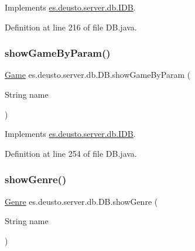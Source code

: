 Implements \hyperlink{interfacees_1_1deusto_1_1server_1_1db_1_1_i_d_b_a572028cc62d36bebee977200b55eba8b}{es.\+deusto.\+server.\+db.\+I\+DB}.



Definition at line 216 of file D\+B.\+java.

\mbox{\label{classes_1_1deusto_1_1server_1_1db_1_1_d_b_a4fc9590d7e5643184ef89c3f03468e7e}} 
\subsubsection{\texorpdfstring{show\+Game\+By\+Param()}{showGameByParam()}}
{\footnotesize\ttfamily \hyperlink{classes_1_1deusto_1_1server_1_1db_1_1data_1_1_game}{Game} es.\+deusto.\+server.\+db.\+D\+B.\+show\+Game\+By\+Param (\begin{DoxyParamCaption}\item[{String}]{name }\end{DoxyParamCaption})}



Implements \hyperlink{interfacees_1_1deusto_1_1server_1_1db_1_1_i_d_b_a0364013a2f73f89fd5f8c635d5c9405a}{es.\+deusto.\+server.\+db.\+I\+DB}.



Definition at line 254 of file D\+B.\+java.

\mbox{\label{classes_1_1deusto_1_1server_1_1db_1_1_d_b_a207ddeb183db925dc20f095033aa4d94}} 
\subsubsection{\texorpdfstring{show\+Genre()}{showGenre()}}
{\footnotesize\ttfamily \hyperlink{classes_1_1deusto_1_1server_1_1db_1_1data_1_1_genre}{Genre} es.\+deusto.\+server.\+db.\+D\+B.\+show\+Genre (\begin{DoxyParamCaption}\item[{String}]{name }\end{DoxyParamCaption})}



